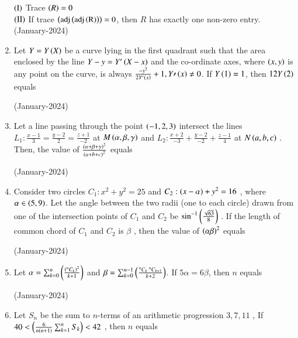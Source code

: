 \documentclass[journal]{IEEEtran}
\begin{document}
\begin{enumerate}
 $\left(\text{I}\right)$ Trace $\left(R\right) = 0$\\
 $\left(\text{II}\right)$ If trace $\left(\operatorname{adj}\left(\operatorname{adj\left(R\right)}\right)\right) = 0$, then $R$ has exactly one non-zero entry.
 \hfill(January-2024)
 \begin{enumerate}  
 \end{enumerate}
 \item Let $Y = Y\left(X\right)$
 be a curve lying in the first quadrant such that the area enclosed by the line $Y - y = Y^{\prime}\left(X - x\right)$
 and the co-ordinate axes, where $\left(x,y\right)$
 is any point on the curve, is always $ \frac{-y^2}{2Y^{\prime}\left(x\right)} + 1, Y{\prime}\left(x\right) \ne 0$. If $Y\left(1\right) = 1$, then $12Y\left(2\right)$
 equals 

 \hfill(January-2024)

 \item Let a line passing through the point $\left(-1,2,3\right)$ intersect the lines $L_1 : \frac{x-1}{3} = \frac{y-2}{2} = \frac{z+1}{-2}$ 
 at $M\left(\alpha, \beta, \gamma\right)$
 and $L_2 : \frac{x+2}{-3} + \frac{y-2}{-2} + \frac{z-1}{4}$ at $N\left(a,b,c\right)$
. Then, the value of $\frac{\left(\alpha+\beta + \gamma\right)^2}{\left(a + b + c\right)^2}$
 equals

 \hfill(January-2024)

 \item Consider two circles $C_1 : x^2 + y^2 = 25$
 and $C_2 : \left(x - \alpha\right) + y^2 = 16$
, where $\alpha \in \left(5,9\right)$. Let the angle between the two radii (one to each circle) drawn from one of the intersection points of $C_1$
 and $C_2$
 be $\sin ^{-1} \left(\frac{\sqrt{63}}{8}\right)$
. If the length of common chord of $C_1$
 and $C_2$
 is $\beta$
, then the value of $\left(\alpha\beta\right)^2$
 equals

 \hfill(January-2024)
 \item Let $\alpha = \sum_{k = 0}^n \left(\frac{\left(^nC_k\right)^2}{k+1}\right)$ and $\beta = \sum_{k = 0}^{n-1} \left(\frac{^nC_k\text{ } ^nC_{k+1}}{k+2}\right)$. If $5\alpha = 6\beta$, then $n$ equals 
 
 \hfil (January-2024)

 \item Let $S_n$
 be the sum to $n$-terms of an arithmetic progression $3,7,11$
, If $40 < \left(\frac{6}{n(n+1)} \sum_{k = 1}^n S_k\right) < 42$
, then $n$
 equals 


\end{enumerate}
\end{document}
